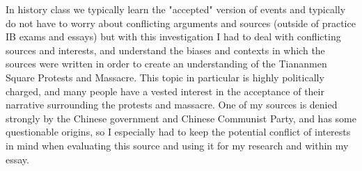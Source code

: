 \documentclass{paper}
\begin{document}
In history class we typically learn the "accepted" version of events and typically do not have to worry about conflicting arguments and sources (outside of practice IB exams and essays) but with this investigation I had to deal with conflicting sources and interests, and understand the biases and contexts in which the sources were written in order to create an understanding of the Tiananmen Square Protests and Massacre.
This topic in particular is highly politically charged, and many people have a vested interest in the acceptance of their narrative surrounding the protests and massacre.
One of my sources is denied strongly by the Chinese government and Chinese Communist Party, and has some questionable origins, so I especially had to keep the potential conflict of interests in mind when evaluating this source and using it for my research and within my essay.

\singlespacing
\newpage
\printbibliography
\thispagestyle{empty}
\end{document}

